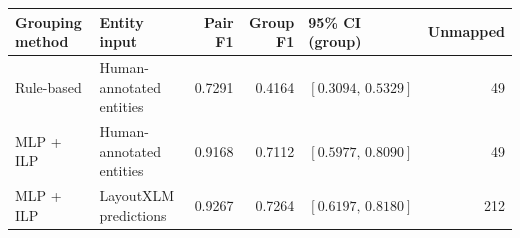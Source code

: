 \begin{tabular}{@{}l>{\raggedright\arraybackslash}p{29mm}rrlr@{}}
\toprule
Grouping method & Entity input & Pair F1 & Group F1 & 95\% CI (group) & Unmapped \\
\midrule
Rule-based & Human-annotated entities & 0.7291 & 0.4164 & $[0.3094,\,0.5329]$ & 49 \\
MLP + ILP & Human-annotated entities & 0.9168 & 0.7112 & $[0.5977,\,0.8090]$ & 49 \\
MLP + ILP & LayoutXLM predictions & 0.9267 & 0.7264 & $[0.6197,\,0.8180]$ & 212 \\
\bottomrule
\end{tabular}
